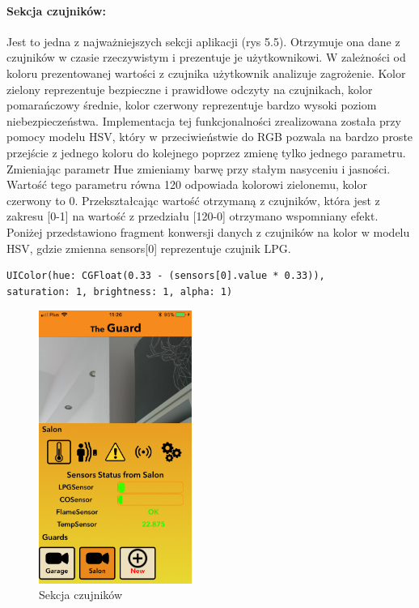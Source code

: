 \paragraph{Sekcja czujników:}
Jest to jedna z najważniejszych sekcji aplikacji (rys 5.5).  Otrzymuje ona dane z czujników w czasie rzeczywistym i prezentuje je użytkownikowi.  W zależności od koloru prezentowanej wartości z czujnika użytkownik analizuje zagrożenie. Kolor zielony reprezentuje bezpieczne i prawidłowe odczyty na czujnikach, kolor pomarańczowy średnie, kolor czerwony reprezentuje bardzo wysoki poziom niebezpieczeństwa. Implementacja tej funkcjonalności zrealizowana została przy pomocy modelu HSV, który w przeciwieństwie do RGB pozwala na bardzo proste przejście z jednego koloru do kolejnego poprzez zmienę tylko jednego parametru. Zmieniając parametr Hue zmieniamy barwę przy stałym nasyceniu i jasności. Wartość tego parametru równa 120\textdegree{} odpowiada kolorowi zielonemu, kolor czerwony to 0\textdegree{}. Przekształcając wartość otrzymaną z czujników, która jest z zakresu [0-1] na wartość z przedziału [120-0] otrzymano wspomniany efekt. 
Poniżej przedstawiono fragment konwersji danych z czujników na kolor w modelu HSV, gdzie zmienna sensors[0] reprezentuje czujnik LPG.
\begin{verbatim}
UIColor(hue: CGFloat(0.33 - (sensors[0].value * 0.33)),
saturation: 1, brightness: 1, alpha: 1)
\end{verbatim}
\begin{figure}[ht]
	\centering
	\includegraphics[width=5cm]{sensors.png}
	\caption{Sekcja czujników}
\end{figure}
